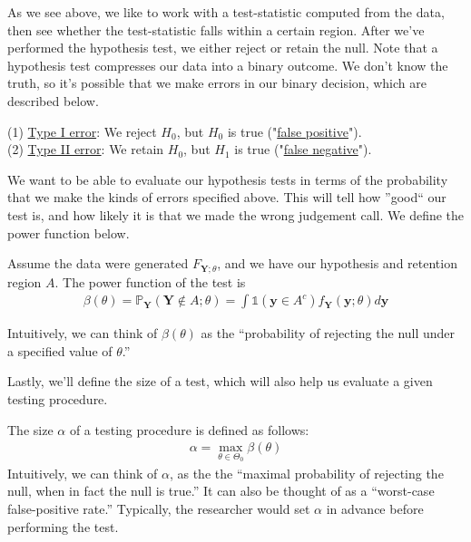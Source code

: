 \documentclass[12pt]{article}
\newcommand{\Prob}{\mathbb{P}}
\begin{document}
\noindent As we see above, we like to work with a test-statistic computed from the data, then see whether the test-statistic falls within a certain region. After we've performed the hypothesis test, we either reject or retain the null. Note that a hypothesis test compresses our data into a binary outcome. We don't know the truth, so it's possible that we make errors in our binary decision, which are described below.

\medskip

\begin{tcolorbox}[breakable, title=\textbf{Definition}: Errors in hypothesis testing]
    (1) \underline{Type I error}: We reject $H_0$, but $H_0$ is true ("\underline{false positive}").\\
    (2) \underline{Type II error}: We retain $H_0$, but $H_1$ is true ("\underline{false negative}").
\end{tcolorbox}
    
\medskip

\noindent We want to be able to evaluate our hypothesis tests in terms of the probability that we make the kinds of errors specified above. This will tell how ''good`` our test is, and how likely it is that we made the wrong judgement call. We define the power function below.

\medskip

\begin{tcolorbox}[breakable, title=\textbf{Definition}: Power]
    Assume the data were generated $F_{\textbf{Y};\theta}$, and we have our hypothesis and retention region $A$. The power function of the test is
    \begin{align*}
        \beta(\theta) = \Prob_\textbf{Y}(\textbf{Y}\notin A; \theta) = \int \mathds{1}(\textbf{y}\in A^c)f_\textbf{Y}(\textbf{y};\theta)d\textbf{y}
    \end{align*}

    Intuitively, we can think of $\beta(\theta)$ as the ``probability of rejecting the null under a specified value of $\theta$.''
\end{tcolorbox}

\medskip

\noindent Lastly, we'll define the size of a test, which will also help us evaluate a given testing procedure.

\medskip

\begin{tcolorbox}[breakable, title = \textbf{Definition}: Size]
    The size $\alpha$ of a testing procedure is defined as follows:
    \begin{align*}
        \alpha = \underset{\theta \in \Theta_0}{\max} \beta(\theta)
    \end{align*}
    Intuitively, we can think of $\alpha$, as the the ``maximal probability of rejecting the null, when in fact the null is true.'' It can also be thought of as a ``worst-case false-positive rate.'' Typically, the researcher would set $\alpha$ in advance before performing the test.
\end{tcolorbox}
\medskip
\end{document}
